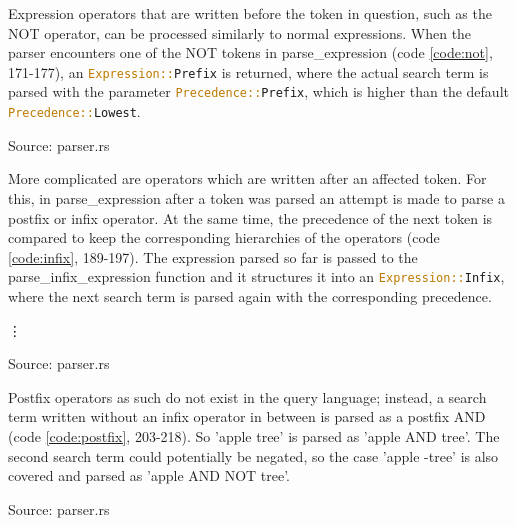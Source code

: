 Expression operators that are written before the token in question, such as the NOT operator, can be processed similarly to normal expressions. When the parser encounters one of the NOT tokens in parse\_expression (code \ref{code:not}, 171-177), an \lstinline[language=Rust]$Expression::Prefix$ is returned, where the actual search term is parsed with the parameter \lstinline[language=Rust]$Precedence::Prefix$, which is higher than the default \lstinline[language=Rust]$Precedence::Lowest$.
\begin{codeenv}
    \label{code:not}
    
    \centerline{Source: parser.rs}
\end{codeenv}
More complicated are operators which are written after an affected token. For this, in parse\_expression after a token was parsed an attempt is made to parse a postfix or infix operator. At the same time, the precedence of the next token is compared to keep the corresponding hierarchies of the operators (code \ref{code:infix}, 189-197). The expression parsed so far is passed to the parse\_infix\_expression function and it structures it into an \lstinline[language=Rust]$Expression::Infix$, where the next search term is parsed again with the corresponding precedence.
\begin{codeenv}
    \label{code:infix}
    
    \vdots
    
    \centerline{Source: parser.rs}
\end{codeenv}
Postfix operators as such do not exist in the query language; instead, a search term written without an infix operator in between is parsed as a postfix AND (code \ref{code:postfix}, 203-218). So 'apple tree' is parsed as 'apple AND tree'. The second search term could potentially be negated, so the case 'apple -tree' is also covered and parsed as 'apple AND NOT tree'.
\begin{codeenv}
    \label{code:postfix}
    
    \centerline{Source: parser.rs}
\end{codeenv}
